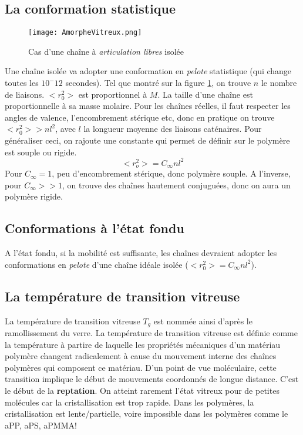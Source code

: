 \documentclass[../main.tex]{subfiles}
\begin{document}
	\subsection{La conformation statistique}
	\begin{figure}[h]
		\begin{center}
			\texttt{[image: AmorpheVitreux.png]}
			\caption{\label{amorphevitreux}Cas d'une chaîne à \textit{articulation libres} isolée}
		\end{center}
	\end{figure}

	Une chaîne isolée va adopter une conformation en \textit{pelote} statistique (qui change toutes les $10^-12$ secondes). Tel que montré sur la figure \ref{amorphevitreux}, on trouve $n$ le nombre de liaisons. $<r_0^2>$ est proportionnel à $M$. La taille d'une chaîne est proportionnelle à sa masse molaire. Pour les chaînes réelles, il faut respecter les angles de valence, l'encombrement stérique etc, donc en pratique on trouve $<r_0^2> > nl^2$, avec $l$ la longueur moyenne des liaisons caténaires. Pour généraliser ceci, on rajoute une constante qui permet de définir sur le polymère est souple ou rigide. 
	\begin{equation}
		<r_o^2> = C_\infty nl^2
	\end{equation}
	Pour $C_\infty = 1$, peu d'encombrement stérique, donc polymère souple. A l'inverse, pour $C_\infty >> 1$, on trouve des chaînes hautement conjuguées, donc on aura un polymère rigide. 
	
	\subsection{Conformations à l'état fondu}
	A l'état fondu, si la mobilité est suffisante, les chaînes devraient adopter les conformations en \textit{pelote} d'une chaîne idéale isolée ($<r_0^2> = C_\infty nl^2$). 
	
	\subsection{La température de transition vitreuse}
	La température de transition vitreuse $T_g$ est nommée ainsi d'après le ramollissement du verre. La température de transition vitreuse est définie comme la température à partire de laquelle les propriétés mécaniques d'un matériau polymère changent radicalement à cause du mouvement interne des chaînes polymères qui composent ce matériau. D'un point de vue moléculaire, cette transition implique le début de mouvements coordonnés de longue distance. C'est le début de la \textbf{reptation}.
	On atteint rarement l'état vitreux pour de petites molécules car la cristallisation est trop rapide. Dans les polymères, la cristallisation est lente/partielle, voire impossible dans les polymères comme le aPP, aPS, aPMMA!
	
\end{document}
